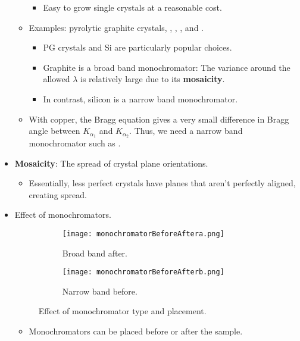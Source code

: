 \documentclass[../notes.tex]{subfiles}
\begin{document}
\begin{itemize}
\begin{itemize}
\begin{itemize}
            \item Easy to grow single crystals at a reasonable cost.
        \end{itemize}
        \item Examples: pyrolytic graphite crystals, , , , and .
        \begin{itemize}
            \item PG crystals and Si are particularly popular choices.
            \item Graphite is a broad band monochromator: The variance around the allowed $\lambda$ is relatively large due to its \textbf{mosaicity}.
            \item In contrast, silicon is a narrow band monochromator.
        \end{itemize}
        \item With copper, the Bragg equation gives a very small difference in Bragg angle between $K_{\alpha_1}$ and $K_{\alpha_2}$. Thus, we need a narrow band monochromator such as .
    \end{itemize}
    \item \textbf{Mosaicity}: The spread of crystal plane orientations.
    \begin{itemize}
        \item Essentially, less perfect crystals have planes that aren't perfectly aligned, creating spread.
    \end{itemize}
    \item Effect of monochromators.
    \begin{figure}[h!]
        \centering
        \begin{subfigure}[b]{0.49\linewidth}
            \centering
            \texttt{[image: monochromatorBeforeAftera.png]}
            \caption{Broad band after.}
            \label{fig:monochromatorBeforeAftera}
        \end{subfigure}
        \begin{subfigure}[b]{0.49\linewidth}
            \centering
            \texttt{[image: monochromatorBeforeAfterb.png]}
            \caption{Narrow band before.}
            \label{fig:monochromatorBeforeAfterb}
        \end{subfigure}
        \caption{Effect of monochromator type and placement.}
        \label{fig:monochromatorBeforeAfter}
    \end{figure}
    \begin{itemize}
        \item Monochromators can be placed before or after the sample.

\end{itemize}
\end{itemize}
\end{document}
